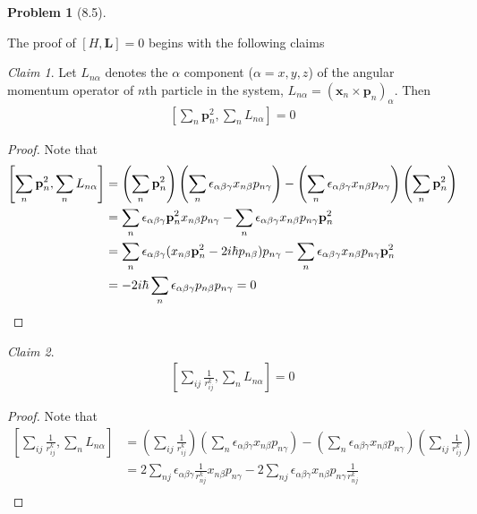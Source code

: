 \documentclass[twoside,11pt]{article}
\theoremstyle{definition}
\newtheorem{problem}{Problem}
\theoremstyle{remark}
\newtheorem*{claim}{Claim}
\begin{document}
\begin{problem}[8.5]
\begin{enumerate}[label=(\alph*)]
The proof of $[H,\mathbf{L}]=0$ begins with the following claims
\begin{claim}
Let $L_{n\alpha}$ denotes the $\alpha$ component ($\alpha=x,y,z$)
of the angular momentum operator of $n$th particle in the system,
$L_{n\alpha} = (\mathbf{x}_n\times\mathbf{p}_n)_\alpha$.
Then
\begin{align*}
    \left[
        \sum_n \mathbf{p}_n^2,
        \sum_n L_{n\alpha}
    \right] = 0
\end{align*}
\end{claim}
\begin{proof}
    Note that
    \begin{align*}
        \left[
        \sum_n \mathbf{p}_n^2,
        \sum_n L_{n\alpha}
    \right] &=
    \left(\sum_n\mathbf{p}_n^2\right)
    \left(\sum_n \epsilon_{\alpha\beta\gamma}x_{n\beta}p_{n\gamma}\right)
    -\left(\sum_n \epsilon_{\alpha\beta\gamma}x_{n\beta}p_{n\gamma}\right)
    \left(\sum_n\mathbf{p}_n^2\right)\\
    &= \sum_n\epsilon_{\alpha\beta\gamma} \mathbf{p}_n^2x_{n\beta}p_{n\gamma}
    -\sum_n\epsilon_{\alpha\beta\gamma}x_{n\beta}p_{n\gamma}\mathbf{p}_n^2\\
    &= \sum_n\epsilon_{\alpha\beta\gamma} (x_{n\beta}\mathbf{p}_n^2 - 2i\hbar p_{n\beta})p_{n\gamma}
    -\sum_n\epsilon_{\alpha\beta\gamma}x_{n\beta}p_{n\gamma}\mathbf{p}_n^2\\
    &= -2i\hbar\sum_n\epsilon_{\alpha\beta\gamma}p_{n\beta}p_{n\gamma} = 0\qedhere
    \end{align*}
\end{proof}
\begin{claim}
\begin{align*}
    \left[\sum_{ij}\frac{1}{r^k_{ij}}, \sum_n L_{n\alpha}\right] = 0
\end{align*}
\end{claim}
\begin{proof}
Note that
\begin{align*}    
    \left[\sum_{ij}\frac{1}{r^k_{ij}}, \sum_n L_{n\alpha}\right] &=
    \left(\sum_{ij}\frac{1}{r^k_{ij}}\right)
    \left(\sum_n\epsilon_{\alpha\beta\gamma}x_{n\beta}p_{n\gamma}\right)
    -\left(\sum_n\epsilon_{\alpha\beta\gamma}x_{n\beta}p_{n\gamma}\right)
    \left(\sum_{ij}\frac{1}{r^k_{ij}}\right)\\
    &= 2\sum_{nj}\epsilon_{\alpha\beta\gamma}\frac{1}{r^k_{nj}}x_{n\beta}p_{n\gamma}
    - 2\sum_{nj}\epsilon_{\alpha\beta\gamma}x_{n\beta}p_{n\gamma}\frac{1}{r^k_{nj}}\\

\end{align*}
\end{proof}
\end{enumerate}
\end{problem}
\end{document}
